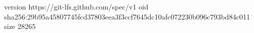 version https://git-lfs.github.com/spec/v1
oid sha256:29b95a45807745fcd37803eea3f3ccf7645dc10afc072230b096c793bd84c011
size 28265
